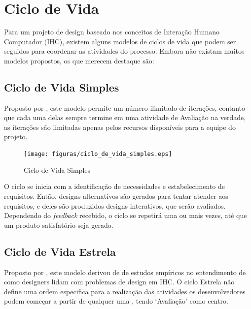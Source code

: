 \chapter[Ciclo de Vida]{Ciclo de Vida}

Para um projeto de design baseado nos conceitos de Interação Humano Computador (IHC), existem alguns modelos de ciclos de vida que podem ser seguidos para coordenar as atividades do processo. Embora não existam muitos modelos propostos, os que merecem destaque são: 

\section{Ciclo de Vida Simples}

Proposto por \cite{BEYOND}, este modelo permite um número ilimitado de iterações, contanto que cada uma delas sempre termine em uma atividade de Avaliação \- na verdade, as iterações são limitadas apenas pelos recursos disponíveis para a equipe do projeto. 

\begin{figure}[h!]
		\texttt{[image: figuras/ciclo\_de\_vida\_simples.eps]}
		\caption{Ciclo de Vida Simples}
\end{figure}

O ciclo se inicia com a identificação de necessidades  e estabelecimento de requisitos. Então, designs alternativos são gerados para tentar atender aos requisitos, e deles são produzidos designs interativos, que serão avaliados. Dependendo do \textit{feedback} recebido, o ciclo se repetirá uma ou mais vezes, até que um produto satisfatório seja gerado.

\section{Ciclo de Vida Estrela}

Proposto por \cite{BHRH}, este modelo derivou de de estudos empíricos no entendimento de como designers lidam com problemas de design em IHC. O ciclo Estrela não define uma ordem especifica para a realização das atividades \- os desenvolvedores podem começar a partir de qualquer uma \-, tendo ‘Avaliação’ como centro.

